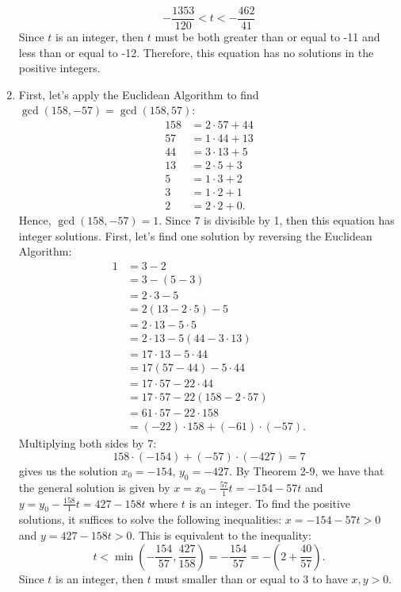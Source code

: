 \begin{solution}
\begin{enumerate}
        $$-\frac{1353}{120} < t < -\frac{462}{41}$$
        Since $t$ is an integer, then $t$ must be both greater than or equal to -11 and less than or equal to -12. Therefore, this equation has no solutions in the positive integers.
        \item First, let's apply the Euclidean Algorithm to find $\gcd(158, -57) = \gcd(158, 57)$:
        \begin{align*}
            158 &= 2\cdot 57 + 44 \\
            57 &= 1 \cdot 44 + 13 \\
            44 &= 3\cdot 13 + 5 \\
            13 &= 2 \cdot 5 + 3 \\
            5 &= 1 \cdot 3 + 2 \\
            3 &= 1 \cdot 2 + 1 \\
            2 &= 2 \cdot 2 + 0.
        \end{align*}
        Hence, $\gcd(158, -57) = 1$. Since $7$ is divisible by 1, then this equation has integer solutions. First, let's find one solution by reversing the Euclidean Algorithm:
        \begin{align*}
            1 &= 3 - 2 \\
            &= 3 - (5 - 3) \\
            &= 2\cdot 3 - 5 \\
            &= 2(13 - 2\cdot 5) - 5 \\
            &= 2 \cdot 13 - 5 \cdot 5 \\
            &= 2 \cdot 13 - 5(44 - 3\cdot 13) \\
            &= 17 \cdot 13 - 5 \cdot 44 \\
            &= 17(57 - 44) - 5 \cdot 44 \\
            &= 17 \cdot 57 - 22 \cdot 44 \\
            &= 17 \cdot 57 - 22 (158 - 2 \cdot 57) \\
            &= 61 \cdot 57 - 22 \cdot 158 \\
            &= (-22) \cdot 158 + (-61) \cdot (-57).
        \end{align*}
        Multiplying both sides by 7:
        $$158 \cdot (-154) + (-57)\cdot(-427) = 7$$
        gives us the solution $x_0 = -154$, $y_0 = -427$. By Theorem 2-9, we have that the general solution is given by $x = x_0 - \frac{57}{1}t = -154 - 57t$ and $y = y_0 - \frac{158}{1}t = 427 - 158t$ where $t$ is an integer. To find the positive solutions, it suffices to solve the following inequalities: $x = -154 - 57t > 0$ and $y = 427 - 158t > 0$. This is equivalent to the inequality:
        $$t < \min\left(-\frac{154}{57}, \frac{427}{158}\right) = -\frac{154}{57} = -\left(2 + \frac{40}{57}\right).$$
        Since $t$ is an integer, then $t$ must smaller than or equal to $3$ to have $x,y > 0$.
    \end{enumerate}
\end{solution}

